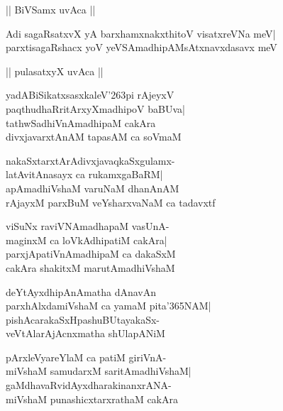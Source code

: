 \documentclass[twoside,12pt,openright]{book}
\def\S{\char'263}
\newcounter{shloka}[chapter]
\begin{document}
\begin{center}
|| BiVSamx uvAca ||
\end{center}
\begin{shloka}%
Adi sagaRsatxvX yA barxhamxnakxthitoV visatxreVNa meV|\\
parxtisagaRshacx yoV yeVSAmadhipAMsAtxnavxdasavx meV
\end{shloka}

\begin{center}
|| pulasatxyX uvAca ||
\end{center}
\begin{shloka}%
yadABiSikatxsasxkaleV\S pi rAjeyxV\\
paqthudhaRritArxyXmadhipoV baBUva|\\
tathwSadhiVnAmadhipaM cakAra\\
divxjavarxtAnAM tapasAM ca soVmaM
\end{shloka}

\begin{shloka}%
nakaSxtarxtArAdivxjavaqkaSxgulamx-\\
latAvitAnasayx ca rukamxgaBaRM|\\
apAmadhiVshaM varuNaM dhanAnAM\\
rAjayxM parxBuM veYsharxvaNaM ca tadavxtf
\end{shloka}

\begin{shloka}%
viSuNx raviVNAmadhapaM vasUnA-\\
maginxM ca loVkAdhipatiM cakAra|\\
parxjApatiVnAmadhipaM ca dakaSxM\\
cakAra shakitxM marutAmadhiVshaM
\end{shloka}

\begin{shloka}%
deYtAyxdhipAnAmatha dAnavAn\\
parxhAlxdamiVshaM ca yamaM pita\char'365NAM|\\
pishAcarakaSxHpashuBUtayakaSx-\\
veVtAlarAjAcnxmatha shUlapANiM
\end{shloka}

\begin{shloka}%
pArxleVyareYlaM ca patiM giriVnA-\\
miVshaM samudarxM saritAmadhiVshaM|\\
gaMdhavaRvidAyxdharakinanxrANA-\\
miVshaM punashicxtarxrathaM cakAra
\end{shloka}
\end{document}
